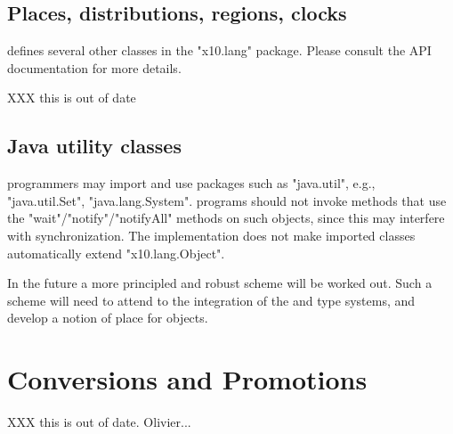 \subsection{Places, distributions, regions, clocks}
\Xten{} defines several other classes in the \xcd"x10.lang"
package. Please consult the API documentation for more details.

XXX this is out of date

\subsection{Java utility classes}
\XtenCurrVer{} programmers may import and use \java{} packages such as
\xcd"java.util", e.g., \xcd"java.util.Set", \xcd"java.lang.System".
\Xten{} programs should not invoke methods
that use the \xcd"wait"/\xcd"notify"/\xcd"notifyAll" methods on such objects,
since this may interfere with \Xten{} synchronization. The
implementation does not make imported \java{} classes
automatically extend \xcd"x10.lang.Object". 


In the future a more principled and robust scheme will be worked
out. Such a scheme will need to attend to the integration of the
\java{} and \Xten{} type systems, and develop a notion of place for 
\java{} objects.
\fi

\cbend
\section{Conversions and Promotions}\label{XtenConversions}\label{XtenPromotions}

XXX this is out of date.  Olivier...


